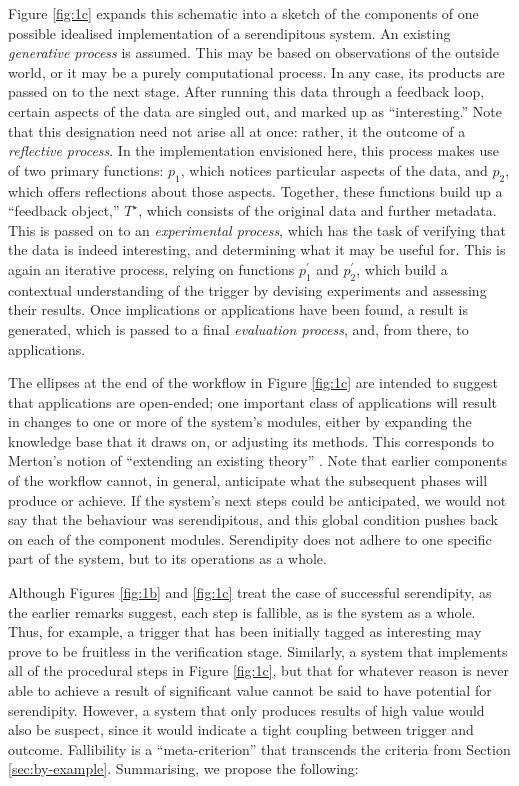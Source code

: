 Figure \ref{fig:1c} expands this schematic into a sketch of the
components of one possible idealised implementation of a serendipitous
system.  An existing \emph{generative process} is assumed.  This may
be based on observations of the outside world, or it may be a purely
computational process.  In any case, its products are passed on to the
next stage.  After running this data through a feedback loop, certain
aspects of the data are singled out, and marked up as
``interesting.''  Note that this designation need not arise all at
once: rather, it the outcome of a \emph{reflective process}.  In the
implementation envisioned here, this process makes use of two primary
functions: $p_1$, which notices particular aspects of the data, and $p_2$, which
offers reflections about those aspects.  Together, these functions build up a
``feedback object,'' $T^{\star}$, which consists of the original data
and further metadata.  This is passed on to an \emph{experimental
  process}, which has the task of verifying that the data
is indeed interesting, and determining what it may be useful for.
This is again an iterative process, relying on functions $p^{\prime}_1$ and $p^{\prime}_2$, which
build a contextual understanding of the trigger by devising experiments and
assessing their results.  Once implications or applications have been found, a result is
generated, which is passed to a final \emph{evaluation process}, and,
from there, to applications.

The ellipses at the end of the workflow in Figure \ref{fig:1c} are
intended to suggest that applications are open-ended; one
important class of applications will result in changes to one or more
of the system's modules, either by expanding the knowledge base
that it draws on, or adjusting its methods.
This corresponds to Merton's notion of ``extending an existing theory''
\cite{merton1948bearing}.
Note that earlier components of the workflow
cannot, in general, anticipate what the subsequent phases will produce
or achieve.  If the system's next steps could be anticipated, we would
not say that the behaviour was serendipitous, and this global condition pushes back on each of the component modules.  
Serendipity does not adhere to one specific part of the system, but to
its operations as a whole.  

Although Figures \ref{fig:1b} and \ref{fig:1c} treat the case of
successful serendipity, as the earlier remarks suggest, each step is
fallible, as is the system as a whole.  Thus, for example, a trigger
that has been initially tagged as interesting may prove to be
fruitless in the verification stage.  Similarly, a system that
implements all of the procedural steps in Figure \ref{fig:1c}, but that for
whatever reason is never able to achieve a result of significant value
cannot be said to have potential for serendipity.  However, a system
that only produces results of high value would also be suspect, since it
would indicate a tight coupling between trigger and outcome.
Fallibility is a ``meta-criterion'' that transcends the criteria from
Section \ref{sec:by-example}.  Summarising, we propose the following:


